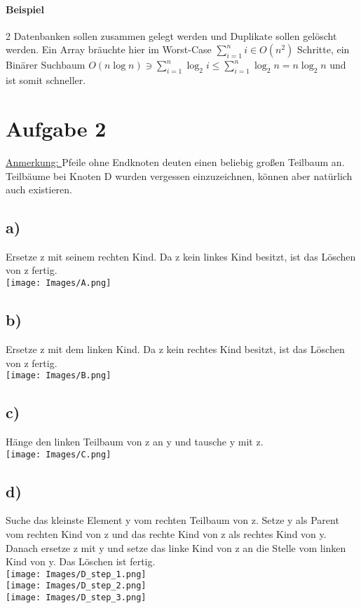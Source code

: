 \documentclass[a4paper,11pt,twoside]{article}
\begin{document}
\paragraph*{Beispiel} 2 Datenbanken sollen zusammen gelegt werden und Duplikate sollen gelöscht werden. Ein Array bräuchte hier im Worst-Case $\sum_{i=1}^n i \in O(n^2)$ Schritte, ein Binärer Suchbaum $O(n \log n)\ni\sum_{i=1}^n\log_2 i \leq \sum_{i=1}^n\log_2 n = n \log_2 n$ und ist somit schneller.
\pagebreak
\section*{Aufgabe 2}
\underline{Anmerkung: } Pfeile ohne Endknoten deuten einen beliebig großen Teilbaum an. Teilbäume bei Knoten D wurden vergessen einzuzeichnen, können aber natürlich auch existieren.
\subsection*{a)} Ersetze z mit seinem rechten Kind. Da z kein linkes Kind besitzt, ist das Löschen von z fertig.\\
\texttt{[image: Images/A.png]}
\subsection*{b)}Ersetze z mit dem linken Kind. Da z kein rechtes Kind besitzt, ist das Löschen von z fertig.\\
\texttt{[image: Images/B.png]}
\subsection*{c)} Hänge den linken Teilbaum von z an y und tausche y mit z. \\
\texttt{[image: Images/C.png]}
\subsection*{d)} Suche das kleinste Element y vom rechten Teilbaum von z. Setze y als Parent vom rechten Kind von z und das rechte Kind von z als rechtes Kind von y. Danach ersetze z mit y und setze das linke Kind von z an die Stelle vom linken Kind von y. Das Löschen ist fertig. \\
\texttt{[image: Images/D\_step\_1.png]} \\
\texttt{[image: Images/D\_step\_2.png]} \\
\texttt{[image: Images/D\_step\_3.png]}
\end{document}
